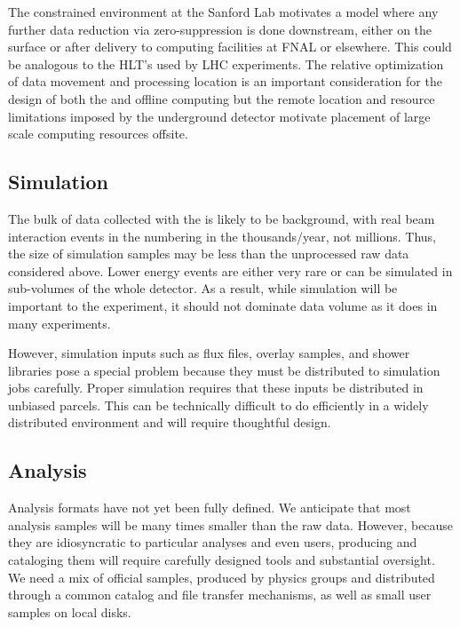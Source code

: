 The constrained environment at the Sanford Lab motivates a model where any further data reduction via zero-suppression is done downstream, either on the surface or after delivery to computing facilities at FNAL or elsewhere. This could be analogous to the HLT's used by LHC experiments. The relative optimization of data movement and processing location is an important consideration for the design of both the  and offline computing but the remote location and resource limitations imposed by the underground detector motivate placement of large scale computing resources offsite. 









\subsection{Simulation}
The bulk of data collected with the  is likely to be background, with real beam interaction events in the  numbering in the thousands/year, not millions. Thus, the size of simulation samples may be less than the unprocessed raw data considered above.  Lower energy events are either very rare or can be simulated in sub-volumes of the whole detector.  As a result, while simulation will be important to the experiment, it should not dominate data volume as it does in many experiments.  

However, simulation inputs such as flux files, overlay samples, and shower libraries pose a special problem because they must be distributed to simulation jobs carefully.   Proper simulation requires that these inputs be distributed in unbiased parcels.  This can be technically difficult to do efficiently in a widely distributed environment and will require thoughtful design. 

\subsection{Analysis}

Analysis formats have not yet been fully defined.  We anticipate that most analysis samples will be many times smaller than the raw data.  However, because they are idiosyncratic to particular analyses and even users,  producing and cataloging them will require carefully designed tools and substantial oversight. 
We need a mix of official samples, produced by physics groups and distributed through a common catalog and file transfer mechanisms, as well as small user samples on local disks. 

